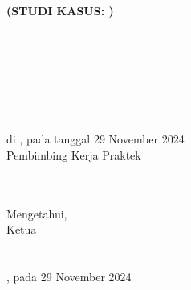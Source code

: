%


%


\chapter*{\lembarPengesahanProdi}
\begin{center}
  \fontsize{14pt}{16.8pt}\selectfont\MakeUppercase{\bo{\judul}}\\
  \bfseries(STUDI KASUS: \namaInstansi)
  
  \vspace{1.5cm}
  \fontsize{14pt}{16.8pt}\selectfont\MakeUppercase{\bo {\tipeta}}\\
  \vspace{1.5cm}

  \\
  \MakeUppercase{\bo{\underline{\penulis}}}\\
  \MakeUppercase{\bo{\nim}}\\
  \vspace{1.2cm}

  \fontsize{12pt}{14.4pt}\selectfont {}\\
  \fontsize{12pt}{14.4pt}\selectfont di \kota, pada tanggal 29 November 2024\\
  \vspace{0.5cm}
  Pembimbing Kerja Praktek
  \vspace{1.5cm}

  {\bo{\underline{\pembimbingpertama}}}\\
  {}\\

  \vspace{1.2cm}
  Mengetahui,\\
  Ketua \programStudi\\
  \fakultas\\
  \universitas\\
  \kota, pada 29 November 2024
  \vspace{1.5cm}

  {\bo{\underline{\kaprodi}}}\\
  {\bo{{\kaprodinip}}}\\


\end{center}
